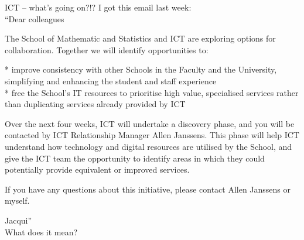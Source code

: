 \documentclass{beamer}
\begin{document}
\begin{frame}{ICT -- what's going on?!?}
I got this email last week:\\
\footnotesize
``Dear colleagues

The School of Mathematic and Statistics and ICT are exploring options for collaboration. Together we will identify opportunities to:

* improve consistency with other Schools in the Faculty and the University, simplifying and enhancing the student and staff experience\\
* free the School’s IT resources to prioritise high value, specialised services rather than duplicating services already provided by ICT

Over the next four weeks, ICT will undertake a discovery phase, and you will be contacted by ICT Relationship Manager Allen Janssens. This phase will help ICT understand how technology and digital resources are utilised by the School, and give the ICT team the opportunity to identify areas in which they could potentially provide equivalent or improved services.

If you have any questions about this initiative, please contact Allen Janssens or myself.

Jacqui''\\
\normalsize
What does it mean?
\end{frame}
\end{document}
